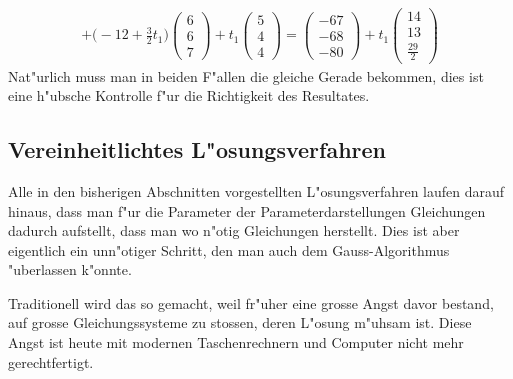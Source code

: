 \begin{beispiel}
\begin{align*}
+\biggl(-12+\frac32t_1\biggr)\begin{pmatrix}6\\6\\7\end{pmatrix}
+t_1\begin{pmatrix}5\\4\\4\end{pmatrix}
=
\begin{pmatrix}-67\\-68\\-80\end{pmatrix}
+t_1
\begin{pmatrix}14\\13\\\frac{29}2\end{pmatrix}
\end{align*}
Nat"urlich muss man in beiden F"allen die gleiche Gerade bekommen,
dies ist eine h"ubsche Kontrolle f"ur die Richtigkeit des Resultates.
\end{beispiel}

\subsection{Vereinheitlichtes L"osungsverfahren\label{section-vereinheitlichtes-verfahren}}
Alle in den bisherigen Abschnitten vorgestellten L"osungsverfahren 
laufen darauf hinaus, dass man f"ur die Parameter der Parameterdarstellungen
Gleichungen dadurch aufstellt, dass man wo n"otig Gleichungen herstellt.
Dies ist aber eigentlich ein unn"otiger Schritt, den man auch dem
Gauss-Algorithmus "uberlassen k"onnte.

Traditionell wird das so gemacht, weil fr"uher eine grosse Angst
davor bestand, auf grosse Gleichungssysteme zu stossen, deren L"osung
m"uhsam ist. Diese Angst ist heute mit modernen Taschenrechnern und
Computer nicht mehr gerechtfertigt.

